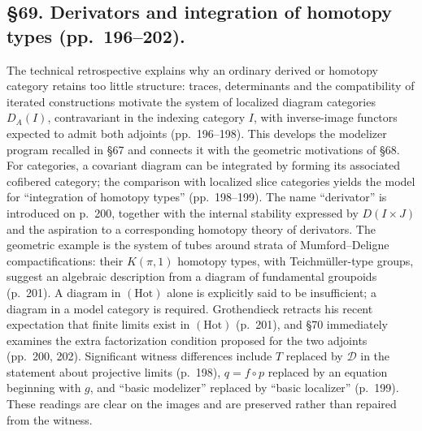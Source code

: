 \documentclass[10pt,oneside]{book}
\begin{document}
\subsection*{\S69. Derivators and integration of homotopy types (pp.\ 196--202).}
The technical retrospective explains why an ordinary derived or homotopy category retains too little structure: traces, determinants and the compatibility of iterated constructions motivate the system of localized diagram categories $D_A(I)$, contravariant in the indexing category $I$, with inverse-image functors expected to admit both adjoints (pp.\ 196--198). This develops the modelizer program recalled in \S67 and connects it with the geometric motivations of \S68. For categories, a covariant diagram can be integrated by forming its associated cofibered category; the comparison with localized slice categories yields the model for ``integration of homotopy types'' (pp.\ 198--199). The name ``derivator'' is introduced on p.\ 200, together with the internal stability expressed by $D(I\times J)$ and the aspiration to a corresponding homotopy theory of derivators. The geometric example is the system of tubes around strata of Mumford--Deligne compactifications: their $K(\pi,1)$ homotopy types, with Teichmüller-type groups, suggest an algebraic description from a diagram of fundamental groupoids (p.\ 201). A diagram in $(\mathrm{Hot})$ alone is explicitly said to be insufficient; a diagram in a model category is required. Grothendieck retracts his recent expectation that finite limits exist in $(\mathrm{Hot})$ (p.\ 201), and \S70 immediately examines the extra factorization condition proposed for the two adjoints (pp.\ 200, 202). Significant witness differences include $T$ replaced by $\mathscr D$ in the statement about projective limits (p.\ 198), $q=f\circ p$ replaced by an equation beginning with $g$, and ``basic modelizer'' replaced by ``basic localizer'' (p.\ 199). These readings are clear on the images and are preserved rather than repaired from the witness.
\end{document}
